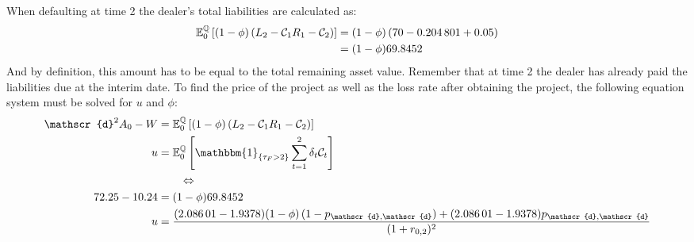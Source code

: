 \documentclass[main.tex]{subfiles}
\begin{document}
            When defaulting at time 2
            the dealer's total liabilities are calculated as:
            \begin{align*}
                \mathbb{E}_{0}^{\mathbb{Q}}\left[
                    (1-\phi)\left(
                        L_{2} - 
                    \mathcal{C}_{1}R_{1}
                        - \mathcal{C}_2
                    \right)
                \right]
                &=
                (1-\phi)\left(\num{70} - \num{0.204801} + \num{0.05}\right)\\
                &=
                (1-\phi)\num{69.8452}
            \end{align*}
            And by definition, this amount has to be equal to the total remaining asset value.
            Remember that at time 2 the dealer has already paid the liabilities due at the interim date.
            To find the price of the project
            as well as the loss rate after obtaining the project,
            the following equation system must be solved for $u$ and $\phi$:
            \begin{align}
                \mathscr{d}^{2}A_{0} - W&=
                \mathbb{E}_{0}^{\rnmeasure}\left[
                    (1-\phi)\left(
                        L_{2} - 
                    \mathcal{C}_{1}R_{1}
                        - \mathcal{C}_2
                    \right)
                \right]
                \label{eqn:swap-example-equation-system-1}
                \\
                u &=
                \mathbb{E}_{0}^{\rnmeasure}\left[
                    \mathbbm{1}_{\{\tau_{F}>2\}} 
                    \sum_{t=1}^{2}
                    \delta_{t}\mathcal{C}_{t}
                \right]
                \label{eqn:swap-example-equation-system-2}
                \\
                &\qquad
                \Leftrightarrow
                \nonumber
                \\
                \num{72.25} - \num{10.24}
                &=
                (1-\phi)\num{69.8452}
                \nonumber
                \\
                u &=
                \frac{
                    (\num{2.08601} - \num{1.9378})(1-\phi)\left(1-p_{\mathscr{d},\mathscr{d}}\right)
                    +
                    (\num{2.08601} - \num{1.9378})p_{\mathscr{d},\mathscr{d}}
                }{
                    (1+r_{0,2})^{2}
                }
                \nonumber
            \end{align}
\end{document}
